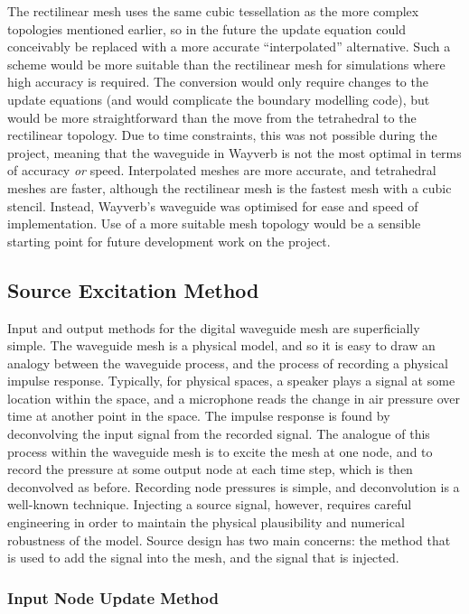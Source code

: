 \documentclass[]{scrreprt}
\begin{document}
The rectilinear mesh uses the same cubic tessellation as the more
complex topologies mentioned earlier, so in the future the update
equation could conceivably be replaced with a more accurate
``interpolated'' alternative. Such a scheme would be more suitable than
the rectilinear mesh for simulations where high accuracy is required.
The conversion would only require changes to the update equations (and
would complicate the boundary modelling code), but would be more
straightforward than the move from the tetrahedral to the rectilinear
topology. Due to time constraints, this was not possible during the
project, meaning that the waveguide in Wayverb is not the most optimal
in terms of accuracy \emph{or} speed. Interpolated meshes are more
accurate, and tetrahedral meshes are faster, although the rectilinear
mesh is the fastest mesh with a cubic stencil. Instead, Wayverb's
waveguide was optimised for ease and speed of implementation. Use of a
more suitable mesh topology would be a sensible starting point for
future development work on the project.

\subsection{Source Excitation Method}\label{source-excitation-method}

Input and output methods for the digital waveguide mesh are
superficially simple. The waveguide mesh is a physical model, and so it
is easy to draw an analogy between the waveguide process, and the
process of recording a physical impulse response. Typically, for
physical spaces, a speaker plays a signal at some location within the
space, and a microphone reads the change in air pressure over time at
another point in the space. The impulse response is found by
deconvolving the input signal from the recorded signal. The analogue of
this process within the waveguide mesh is to excite the mesh at one
node, and to record the pressure at some output node at each time step,
which is then deconvolved as before. Recording node pressures is simple,
and deconvolution is a well-known technique. Injecting a source signal,
however, requires careful engineering in order to maintain the physical
plausibility and numerical robustness of the model. Source design has
two main concerns: the method that is used to add the signal into the
mesh, and the signal that is injected.

\subsubsection{Input Node Update Method}\label{input-node-update-method}
\end{document}
